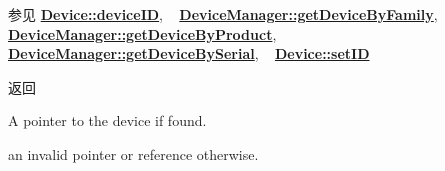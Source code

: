 \begin{DoxySeeAlso}{参见}
{\bfseries \hyperlink{classmv_i_m_p_a_c_t_1_1acquire_1_1_device_a239e7c6f214d441015ef15e4cbde83ca}{Device\+::device\+I\+D}}, ~\newline
 {\bfseries \hyperlink{classmv_i_m_p_a_c_t_1_1acquire_1_1_device_manager_a8ffbf3573bd8836d2583b271b5f43834}{Device\+Manager\+::get\+Device\+By\+Family}}, ~\newline
 {\bfseries \hyperlink{classmv_i_m_p_a_c_t_1_1acquire_1_1_device_manager_a61b35d3c0ebbf79dc15d8704d6e772ad}{Device\+Manager\+::get\+Device\+By\+Product}}, ~\newline
 {\bfseries \hyperlink{classmv_i_m_p_a_c_t_1_1acquire_1_1_device_manager_a7bf58516da0597acf3d899981e52aa92}{Device\+Manager\+::get\+Device\+By\+Serial}}, ~\newline
 {\bfseries \hyperlink{classmv_i_m_p_a_c_t_1_1acquire_1_1_device_a3cf73e03bb07320488a703a573f043ac}{Device\+::set\+I\+D}} 
\end{DoxySeeAlso}
\begin{DoxyReturn}{返回}

\begin{DoxyItemize}
\item A pointer to the device if found. ~\newline

\item an invalid pointer or reference otherwise. 
\end{DoxyItemize}
\end{DoxyReturn}

